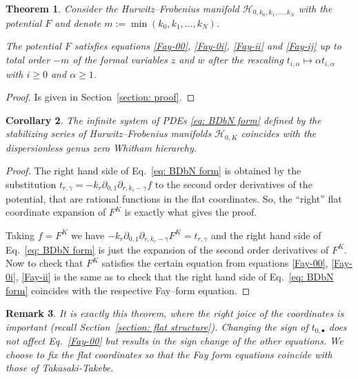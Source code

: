 \documentclass[12pt,a4paper]{amsart}
\def\H{{\mathcal H}}
\newcommand{\p}{{\partial}}
\newcommand{\<}{\left<}
\renewcommand{\>}{\right>}
\newtheorem{theorem}{Theorem}[section]
\newtheorem{corollary}[theorem]{Corollary}
\newtheorem{remark}[theorem]{Remark}
\numberwithin{equation}{section}
\begin{document}
\begin{theorem}\label{theorem: Fay}
    Consider the Hurwitz--Frobenius manifold $\H_{0,k_0,k_1,\dots,k_N}$ with the potential $F$ and denote $m := \min(k_0,k_1,\dots,k_N)$.
    
    The potential $F$ satisfies equations \eqref{Fay-00}, \eqref{Fay-0i}, \eqref{Fay-ii} and \eqref{Fay-ij} up to total order $-m$ of the formal variables $z$ and $w$ after the rescaling $t_{i,\alpha} \mapsto \alpha t_{i,\alpha}$ with $ i \ge 0$ and $\alpha \ge 1$.
\end{theorem}
\begin{proof}
    Is given in Section~\ref{section: proof}.
\end{proof}
\begin{corollary}
    The infinite system of PDEs \eqref{eq: BDbN form} defined by the stabilizing series of Hurwitz--Frobenius manifolds $\H_{0,K}$ coincides with the dispersionless genus zero Whitham hierarchy.
\end{corollary}
\begin{proof}
    The right hand side of Eq.~\eqref{eq: BDbN form} is obtained by the substitution $t_{r,\gamma} = -k_r \p_{0,1} \p_{r,k_r-\gamma} f$ to the second order derivatives of the potential, that are rational functions in the flat coordinates. So, the ``right'' flat coordinate expansion of $F^K$ is exactly what gives the proof.

    Taking $f = F^K$ we have $-k_r \p_{0,1} \p_{r,k_r-\gamma} F^K = t_{r,\gamma}$ and the right hand side of Eq.~\eqref{eq: BDbN form} is just the expansion of the second order derivatives of $F^K$. Now to check that $F^K$ satisfies the certain equation from equations \eqref{Fay-00}, \eqref{Fay-0i}, \eqref{Fay-ii} is the same as to check that the right hand side of Eq.~\eqref{eq: BDbN form} coincides with the respective Fay--form equation.
\end{proof}

\begin{remark}\label{remark: coordinates sign}
    It is exactly this theorem, where the right joice of the coordinates is important (recall Section~\ref{section: flat structure}). Changing the sign of $t_{0,\bullet}$ does not affect Eq.~\eqref{Fay-00} but results in the sign change of the other equations. We choose to fix the flat coordinates so that the Fay form equations coincide with those of Takasaki-Takebe.
\end{remark}
\end{document}
